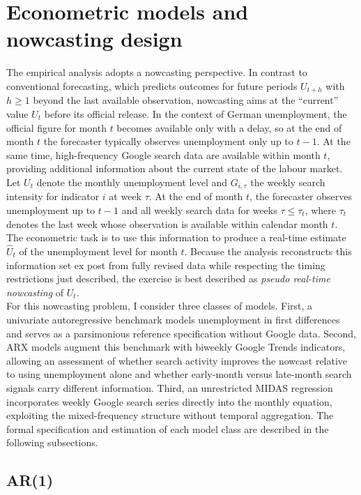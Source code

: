 \documentclass[12pt,a4paper]{article}
\begin{document}
\section{Econometric models and nowcasting design}
The empirical analysis adopts a nowcasting perspective. In contrast to conventional forecasting, which predicts outcomes for future periods $U_{t+h}$ with $h \geq 1$ beyond the last available observation, nowcasting aims at the ``current'' value $U_t$ before its official release. In the context of German unemployment, the official figure for month $t$ becomes available only with a delay, so at the end of month $t$ the forecaster typically observes unemployment only up to $t-1$. At the same time, high-frequency Google search data are available within month $t$, providing additional information about the current state of the labour market. \\
Let $U_t$ denote the monthly unemployment level and $G_{i,\tau}$ the weekly search intensity for indicator $i$ at week $\tau$. At the end of month $t$, the forecaster observes unemployment up to $t-1$ and all weekly search data for weeks $\tau \le \tau_t$, where $\tau_t$ denotes the last week whose observation is available within calendar month $t$. The econometric task is to use this information to produce a real-time estimate $\widehat{U}_t$ of the unemployment level for month $t$. Because the analysis reconstructs this information set ex post from fully revised data while respecting the timing restrictions just described, the exercise is best described as \emph{pseudo real-time nowcasting} of $U_t$. \\
For this nowcasting problem, I consider three classes of models. First, a univariate autoregressive benchmark models unemployment in first differences and serves as a parsimonious reference specification without Google data. Second, ARX models augment this benchmark with biweekly Google Trends indicators, allowing an assessment of whether search activity improves the nowcast relative to using unemployment alone and whether early-month versus late-month search signals carry different information. Third, an unrestricted MIDAS regression incorporates weekly Google search series directly into the monthly equation, exploiting the mixed-frequency structure without temporal aggregation. The formal specification and estimation of each model class are described in the following subsections.



\subsection{AR(1)}
\end{document}
